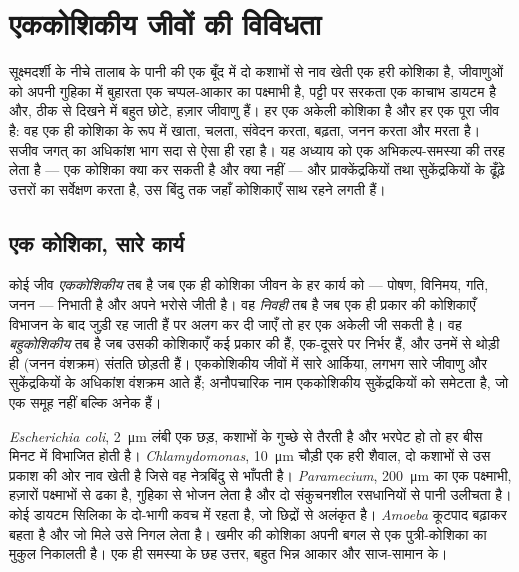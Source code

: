\chapter{एककोशिकीय जीवों की विविधता}\label{ch:b2:unicellular-diversity}

सूक्ष्मदर्शी के नीचे तालाब के पानी की एक बूँद में दो कशाभों से नाव खेती
एक हरी कोशिका है, जीवाणुओं को अपनी गुहिका में बुहारता एक चप्पल-आकार का
पक्ष्माभी है, पट्टी पर सरकता एक काचाभ डायटम है और, ठीक से दिखने में
बहुत छोटे, हज़ार जीवाणु हैं। हर एक अकेली कोशिका है और हर एक पूरा जीव है:
वह एक ही कोशिका के रूप में खाता, चलता, संवेदन करता, बढ़ता, जनन करता और
मरता है। सजीव जगत् का अधिकांश भाग सदा से ऐसा ही रहा है। यह अध्याय
 को एक अभिकल्प-समस्या की तरह लेता है --- एक कोशिका
क्या कर सकती है और क्या नहीं --- और प्राक्केंद्रकियों तथा सुकेंद्रकियों
के ढूँढ़े उत्तरों का सर्वेक्षण करता है, उस बिंदु तक जहाँ कोशिकाएँ साथ
रहने लगती हैं।

\section{एक कोशिका, सारे कार्य}

\begin{definition}[एककोशिकीय, निवही, बहुकोशिकीय]\label{def:b2:unicellular-diversity:unicellular}
कोई जीव \emph{एककोशिकीय} तब है जब एक ही कोशिका
जीवन के हर कार्य को --- पोषण, विनिमय, गति, जनन --- निभाती है और अपने
भरोसे जीती है। वह \emph{निवही} तब है जब एक ही प्रकार
की कोशिकाएँ विभाजन के बाद जुड़ी रह जाती हैं पर अलग कर दी जाएँ तो हर एक
अकेली जी सकती है। वह \emph{बहुकोशिकीय} तब है जब
उसकी कोशिकाएँ कई प्रकार की हैं, एक-दूसरे पर निर्भर हैं, और उनमें से
थोड़ी ही (जनन वंशक्रम) संतति छोड़ती हैं। एककोशिकीय जीवों में सारे
आर्किया, लगभग सारे जीवाणु और सुकेंद्रकियों के अधिकांश वंशक्रम आते हैं;
अनौपचारिक नाम \emph{} एककोशिकीय सुकेंद्रकियों को समेटता है,
जो एक समूह नहीं बल्कि अनेक हैं।
\end{definition}

\begin{example}[एक बूँद के छह निवासी]\label{ex:b2:unicellular-diversity:drop}
\emph{Escherichia coli}, \qty{2}{\micro m} लंबी एक छड़, कशाभों के गुच्छे
से तैरती है और भरपेट हो तो हर बीस मिनट में विभाजित होती है।
\emph{Chlamydomonas}, \qty{10}{\micro m} चौड़ी एक हरी शैवाल, दो कशाभों से
उस प्रकाश की ओर नाव खेती है जिसे वह नेत्रबिंदु से भाँपती है।
\emph{Paramecium}, \qty{200}{\micro m} का एक पक्ष्माभी, हज़ारों पक्ष्माभों
से ढका है, गुहिका से भोजन लेता है और दो संकुचनशील रसधानियों से पानी
उलीचता है। कोई डायटम सिलिका के दो-भागी कवच में रहता है, जो छिद्रों से
अलंकृत है। \emph{Amoeba} कूटपाद बढ़ाकर बहता है और जो मिले उसे निगल लेता
है। खमीर की कोशिका अपनी बगल से एक पुत्री-कोशिका का मुकुल निकालती है।
एक ही समस्या के छह उत्तर, बहुत भिन्न आकार और साज-सामान के।
\end{example}

